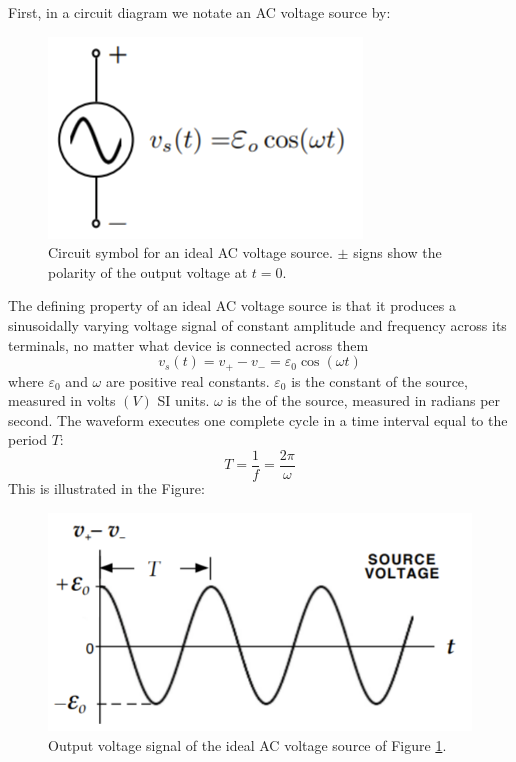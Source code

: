 \documentclass[12pt, a4paper, oneside, openright, titlepage]{book}
\begin{document}
First, in a circuit diagram we notate an AC voltage source by:

\begin{figure}[H]
    \centering
    \includegraphics[scale = 0.8]{Images/ACSymbol.PNG}
    \caption{Circuit symbol for an ideal AC voltage source. $\pm$ signs show the polarity of the output voltage at $t = 0$.}
    \label{fig:ACSymb}
\end{figure}

The defining property of an ideal AC voltage source is that it produces a sinusoidally varying voltage signal of constant amplitude and frequency across its terminals, no matter what device is connected across them $$v_s(t) = v_+ - v_- = \varepsilon_0\cos(\omega t)$$
where $\varepsilon_0$ and $\omega$ are positive real constants. $\varepsilon_0$ is the constant  of the source, measured in volts $(V)$ SI units. $\omega$ is the  of the source, measured in radians per second. The waveform executes one complete cycle in a time interval equal to the period $T$: $$T = \frac{1}{f} = \frac{2\pi }{\omega}$$ This is illustrated in the Figure:

\begin{figure}[H]
    \centering
    \includegraphics[scale = 0.8]{Images/ACVoltageSource.PNG}
    \caption{Output voltage signal of the ideal AC voltage source of Figure \ref{fig:ACSymb}.}
    \label{fig:ACSource}
\end{figure}
\end{document}
